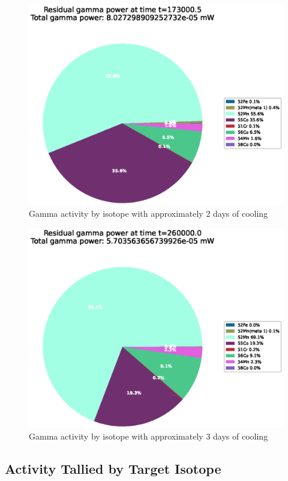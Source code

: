 \begin{figure}[!htb]
\centering
\includegraphics[width=0.8\linewidth]{chapters/activity_code/fe-activity-v2/residual-energy/0233_173000.eps}
\caption{Gamma activity by isotope with approximately 2 days of cooling}
\label{fig:activity-v2-residual-power-173000s}
\end{figure}

\begin{figure}[!htb]
\centering
\includegraphics[width=0.8\linewidth]{chapters/activity_code/fe-activity-v2/residual-energy/0300_260000.eps}
\caption{Gamma activity by isotope with approximately 3 days of cooling}
\label{fig:activity-v2-residual-power-260000s}
\end{figure}



\clearpage

\subsection{Activity Tallied by Target Isotope}

